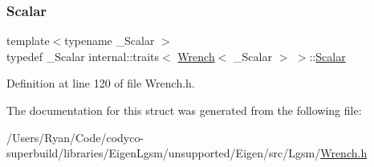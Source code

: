 \subsubsection{\texorpdfstring{Scalar}{Scalar}}
{\footnotesize\ttfamily template$<$typename \+\_\+\+Scalar $>$ \\
typedef \+\_\+\+Scalar internal\+::traits$<$ \hyperlink{class_wrench}{Wrench}$<$ \+\_\+\+Scalar $>$ $>$\+::\hyperlink{structinternal_1_1traits_3_01_wrench_3_01___scalar_01_4_01_4_ad1e23cc3d2be914db89e28e5c26b87e1}{Scalar}}



Definition at line 120 of file Wrench.\+h.



The documentation for this struct was generated from the following file\+:\begin{DoxyCompactItemize}
\item 
/\+Users/\+Ryan/\+Code/codyco-\/superbuild/libraries/\+Eigen\+Lgsm/unsupported/\+Eigen/src/\+Lgsm/\hyperlink{_wrench_8h}{Wrench.\+h}\end{DoxyCompactItemize}
